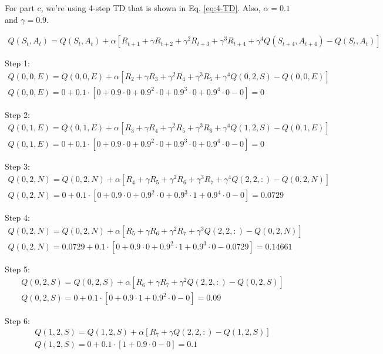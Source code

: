 \documentclass[12pt]{article}
\begin{document}
For part c, we're using 4-step TD that is shown in Eq. \ref{eq:4-TD}. Also, $\alpha = 0.1$ and $\gamma = 0.9$.

\begin{gather}
  Q(S_t, A_t) = Q(S_t, A_t) + \alpha [R_{t+1} + \gamma R_{t+2} + \gamma^2 R_{t+3} + \gamma^3 R_{t+4} + \gamma^4 Q(S_{t+4}, A_{t+4}) - Q(S_t, A_t)] \label{eq:4-TD}
\end{gather}

Step 1:
\begin{gather*}
  Q(0, 0, E) = Q(0, 0, E) + \alpha [R_2 + \gamma R_3 + \gamma^2 R_4 + \gamma^3 R_5 + \gamma^4 Q(0, 2, S) - Q(0, 0, E)] \\
  Q(0, 0, E) = 0 + 0.1 \cdot [0 + 0.9 \cdot 0 + 0.9^2 \cdot 0 + 0.9^3 \cdot 0 + 0.9^4 \cdot 0 - 0] = 0
\end{gather*}

Step 2:
\begin{gather*}
  Q(0, 1, E) = Q(0, 1, E) + \alpha [R_3 + \gamma R_4 + \gamma^2 R_5 + \gamma^3 R_6 + \gamma^4 Q(1, 2, S) - Q(0, 1, E)] \\
  Q(0, 1, E) = 0 + 0.1 \cdot [0 + 0.9 \cdot 0 + 0.9^2 \cdot 0 + 0.9^3 \cdot 0 + 0.9^4 \cdot 0 - 0] = 0
\end{gather*}

Step 3:
\begin{gather*}
  Q(0, 2, N) = Q(0, 2, N) + \alpha [R_4 + \gamma R_5 + \gamma^2 R_6 + \gamma^3 R_7 + \gamma^4 Q(2, 2, :) - Q(0, 2, N)] \\
  Q(0, 2, N) = 0 + 0.1 \cdot [0 + 0.9 \cdot 0 + 0.9^2 \cdot 0 + 0.9^3 \cdot 1 + 0.9^4 \cdot 0 - 0] = 0.0729
\end{gather*}

Step 4:
\begin{gather*}
  Q(0, 2, N) = Q(0, 2, N) + \alpha [R_5 + \gamma R_6 + \gamma^2 R_7 + \gamma^3 Q(2, 2, :) - Q(0, 2, N)] \\
  Q(0, 2, N) = 0.0729 + 0.1 \cdot [0 + 0.9 \cdot 0 + 0.9^2 \cdot 1 + 0.9^3 \cdot 0 - 0.0729] = 0.14661
\end{gather*}

Step 5:
\begin{gather*}
  Q(0, 2, S) = Q(0, 2, S) + \alpha [R_6 + \gamma R_7 + \gamma^2 Q(2, 2, :) - Q(0, 2, S)] \\
  Q(0, 2, S) = 0 + 0.1 \cdot [0 + 0.9 \cdot 1 + 0.9^2 \cdot 0 - 0] = 0.09
\end{gather*}

Step 6:
\begin{gather*}
  Q(1, 2, S) = Q(1, 2, S) + \alpha [R_7 + \gamma Q(2, 2, :) - Q(1, 2, S)] \\
  Q(1, 2, S) = 0 + 0.1 \cdot [1 + 0.9 \cdot 0 - 0] = 0.1
\end{gather*}



\end{document}
